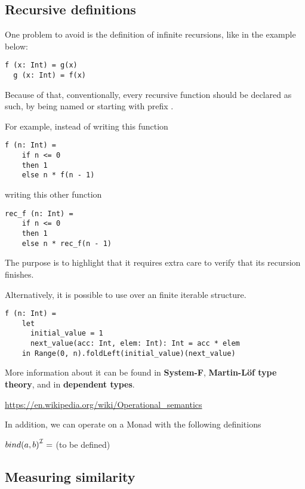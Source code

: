 \subsection{Recursive definitions}


One problem to avoid is the definition of infinite recursions, like in the example below:

\begin{lstlisting}[label={lst:exampleOfRecursion}]
  f (x: Int) = g(x)
  g (x: Int) = f(x)
\end{lstlisting}

Because of that, conventionally, every recursive function should be declared as such, by being named or starting with prefix .

For example, instead of writing this function
\begin{lstlisting}[label={lst:exampleOfFactorialBadNaming}]
  f (n: Int) =
    if n <= 0
    then 1
    else n * f(n - 1)
\end{lstlisting}

writing this other function
\begin{lstlisting}[label={lst:exampleOfFactorialGoodNaming}]
  rec_f (n: Int) =
    if n <= 0
    then 1
    else n * rec_f(n - 1)
\end{lstlisting}

The purpose is to highlight that it requires extra care to verify that its recursion finishes.

Alternatively, it is possible to use  over an finite iterable structure.
\begin{lstlisting}[label={lst:exampleOfFactorialFoldLeft}]
  f (n: Int) =
    let
      initial_value = 1
      next_value(acc: Int, elem: Int): Int = acc * elem
    in Range(0, n).foldLeft(initial_value)(next_value)
\end{lstlisting}

More information about it can be found in \textbf{System-F}, \textbf{Martin-L\"{o}f type theory}, and in \textbf{dependent types}.


\url{https://en.wikipedia.org/wiki/Operational_semantics}

In addition, we can operate on a Monad with the following definitions

${bind(a, b)}^{\mathcal{I}} = $ (to be defined)

\subsection{Measuring similarity}

